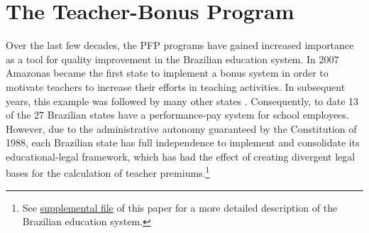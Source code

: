 \documentclass[a4paper, 12pt]{article}
\begin{document}












\section{The Teacher-Bonus Program} \label{Paper3-Bonus}


Over the last few decades, the PFP programs have gained increased importance as a tool for quality improvement in the Brazilian education system. In 2007 Amazonas became the first state to implement a bonus system in order to motivate teachers to increase their efforts in teaching activities. In subsequent years, this example was followed by many other states \citep{scorzafave2016efeito}. Consequently, to date 13 of the 27 Brazilian states have a performance-pay system for school employees. However, due to the administrative autonomy guaranteed by the Constitution of 1988, each Brazilian state has full independence to implement and consolidate its educational-legal framework, which has had the effect of creating divergent legal bases for the calculation of teacher premiums.\footnote{See \hyperref[SuppMaterial]{supplemental file} of this paper for a more detailed description of the Brazilian education system.}
\end{document}
